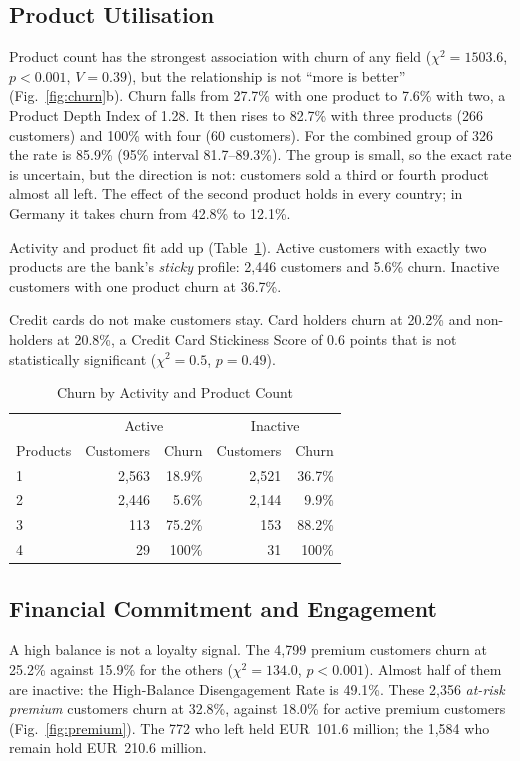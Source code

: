 \documentclass[10pt,twocolumn,letterpaper]{article}
\begin{document}
\subsection{Product Utilisation}
Product count has the strongest association with churn of any field ($\chi^2 = 1503.6$, $p < 0.001$, $V = 0.39$), but the relationship is not ``more is better'' (Fig.~\ref{fig:churn}b). Churn falls from 27.7\% with one product to 7.6\% with two, a Product Depth Index of 1.28. It then rises to 82.7\% with three products (266 customers) and 100\% with four (60 customers). For the combined group of 326 the rate is 85.9\% (95\% interval 81.7--89.3\%). The group is small, so the exact rate is uncertain, but the direction is not: customers sold a third or fourth product almost all left. The effect of the second product holds in every country; in Germany it takes churn from 42.8\% to 12.1\%.

Activity and product fit add up (Table~\ref{tab:ap}). Active customers with exactly two products are the bank's \emph{sticky} profile: 2,446 customers and 5.6\% churn. Inactive customers with one product churn at 36.7\%.

Credit cards do not make customers stay. Card holders churn at 20.2\% and non-holders at 20.8\%, a Credit Card Stickiness Score of 0.6 points that is not statistically significant ($\chi^2 = 0.5$, $p = 0.49$).

\begin{table}[t]
\caption{Churn by Activity and Product Count}\label{tab:ap}
\centering\footnotesize
\begin{tabular}{@{}lrrrr@{}}
\toprule
 & \multicolumn{2}{c}{Active} & \multicolumn{2}{c}{Inactive}\\
Products & Customers & Churn & Customers & Churn\\
\midrule
1 & 2,563 & 18.9\% & 2,521 & 36.7\%\\
2 & 2,446 & 5.6\% & 2,144 & 9.9\%\\
3 & 113 & 75.2\% & 153 & 88.2\%\\
4 & 29 & 100\% & 31 & 100\%\\
\bottomrule
\end{tabular}
\end{table}

\subsection{Financial Commitment and Engagement}
A high balance is not a loyalty signal. The 4,799 premium customers churn at 25.2\% against 15.9\% for the others ($\chi^2 = 134.0$, $p < 0.001$). Almost half of them are inactive: the High-Balance Disengagement Rate is 49.1\%. These 2,356 \emph{at-risk premium} customers churn at 32.8\%, against 18.0\% for active premium customers (Fig.~\ref{fig:premium}). The 772 who left held EUR~101.6 million; the 1,584 who remain hold EUR~210.6 million.
\end{document}
